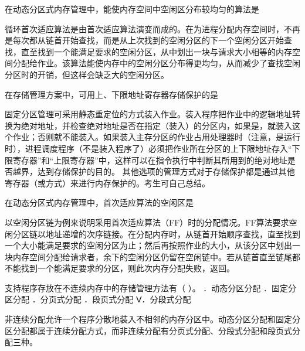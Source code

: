 \question 在动态分区式内存管理中，能使内存空间中空闲区分布较均匀的算法是
\par{}
\begin{solution}循环首次适应算法是由首次适应算法演变而成的。在为进程分配内存空间时，不再是每次都从链首开始查找，而是从上次找到的空闲分区的下一个空闲分区开始查找，直至找到一个能满足要求的空闲分区，从中划出一块与请求大小相等的内存空间分配给作业。该算法能使内存中的空闲分区分布得更均匀，从而减少了查找空闲分区时的开销，但这样会缺乏大的空闲分区。
\end{solution}
\question 在存储管理方案中，可用上、下限地址寄存器存储保护的是
\par{}
\begin{solution}固定分区管理可采用静态重定位的方式装入作业。装入程序把作业中的逻辑地址转换为绝对地址，并检查绝对地址是否在指定（装入）的分区内，如果是，就装入这个作业；否则就不能装入。如果装入主存分区的作业占用处理器时（注意，是运行时），进程调度程序（不是装入程序了）必须把作业所在分区的上下限地址存入``下限寄存器''和``上限寄存器''中，这样可以在指令执行中判断其所用到的绝对地址是否越界，达到存储保护的目的。
其他选项的管理方式对于存储保护都是通过其他寄存器（或方式）来进行内存保护的。考生可自己总结。
\end{solution}
\question 在动态分区式内存管理中，首次适应算法的空闲区是
\par{}
\begin{solution}以空闲分区链为例来说明采用首次适应算法（FF）时的分配情况。FF算法要求空闲分区链以地址递增的次序链接。在分配内存时，从链首开始顺序查找，直至找到一个大小能满足要求的空闲分区为止；然后再按照作业的大小，从该分区中划出一块内存空间分配给请求者，余下的空闲分区仍留在空闲链中。若从链首直至链尾都不能找到一个能满足要求的分区，则此次内存分配失败，返回。
\end{solution}
\question 支持程序存放在不连续内存中的存储管理方法有（ ）。 ．动态分区分配
．固定分区分配 ．分页式分配 ．段页式分配 Ⅴ．分段式分配
\par{}
\begin{solution}非连续分配允许一个程序分散地装入不相邻的内存分区中。动态分区分配和固定分区分配都属于连续分配方式，而非连续分配有分页式分配、分段式分配和段页式分配三种。
\end{solution}
